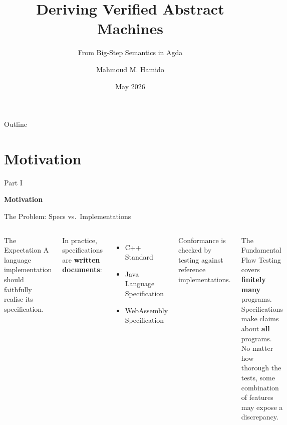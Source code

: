 \documentclass[10pt,compress,aspectratio=169]{beamer}
\title{Deriving Verified Abstract Machines}
\subtitle{From Big-Step Semantics in Agda}
\date[May 2026]{May 2026}
\author[M.\,Hamido]{Mahmoud M. Hamido}
\institute[]{Department of Computer Science\\RPTU Kaiserslautern-Landau}
\begin{document}
\maketitle

\begin{frame}{Outline}
	\tableofcontents
\end{frame}

\section{Motivation}

\begin{frame}{}
  \centering\vfill
  {Part I\par}
  \bigskip
  {\Large\bfseries Motivation}
  \vfill
\end{frame}

\begin{frame}{The Problem: Specs vs.\ Implementations}
  \begin{columns}[T]
      \begin{block}{The Expectation}
        A language implementation should faithfully realise its specification.
      \end{block}
      \bigskip
      In practice, specifications are \textbf{written documents}:
      \begin{itemize}
        \item C++ Standard
        \item Java Language Specification
        \item WebAssembly Specification
      \end{itemize}
      \bigskip
      Conformance is checked by testing against reference implementations.
      \begin{alertblock}{The Fundamental Flaw}
        Testing covers \textbf{finitely many} programs.\\[6pt]
        Specifications make claims about \textbf{all} programs.\\[6pt]
        No matter how thorough the tests, some combination of features may expose a discrepancy.
      \end{alertblock}
  \end{columns}
\end{frame}
\end{document}
